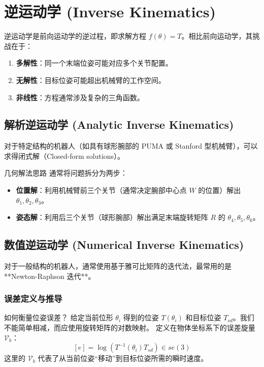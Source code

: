 \chapter{逆运动学 (Inverse Kinematics)}

逆运动学是前向运动学的逆过程，即求解方程 $f(\theta) = T$。相比前向运动学，其挑战在于：
\begin{enumerate}
    \item \textbf{多解性}：同一个末端位姿可能对应多个关节配置。
    \item \textbf{无解性}：目标位姿可能超出机械臂的工作空间。
    \item \textbf{非线性}：方程通常涉及复杂的三角函数。
\end{enumerate}

\section{解析逆运动学 (Analytic Inverse Kinematics)}

对于特定结构的机器人（如具有球形腕部的 PUMA 或 Stanford 型机械臂），可以求得闭式解（Closed-form solutions）。

\begin{thoughtbox}{几何解法思路}
通常将问题拆分为两步：
\begin{itemize}
    \item \textbf{位置解}：利用机械臂前三个关节（通常决定腕部中心点 $W$ 的位置）解出 $\theta_1, \theta_2, \theta_3$。
    \item \textbf{姿态解}：利用后三个关节（球形腕部）解出满足末端旋转矩阵 $R$ 的 $\theta_4, \theta_5, \theta_6$。
\end{itemize}
\end{thoughtbox}

\section{数值逆运动学 (Numerical Inverse Kinematics)}

对于一般结构的机器人，通常使用基于雅可比矩阵的迭代法，最常用的是 **Newton-Raphson 迭代**。

\subsection{误差定义与推导}

\begin{thoughtbox}{如何衡量位姿误差？}
给定当前位形 $\theta_i$ 得到的位姿 $T(\theta_i)$ 和目标位姿 $T_{sd}$。我们不能简单相减，而应使用旋转矩阵的对数映射。
定义在物体坐标系下的误差旋量 $\mathcal{V}_b$：
\[ [e] = \log(T^{-1}(\theta_i) T_{sd}) \in se(3) \]
这里的 $\mathcal{V}_b$ 代表了从当前位姿“移动”到目标位姿所需的瞬时速度。
\end{thoughtbox}

